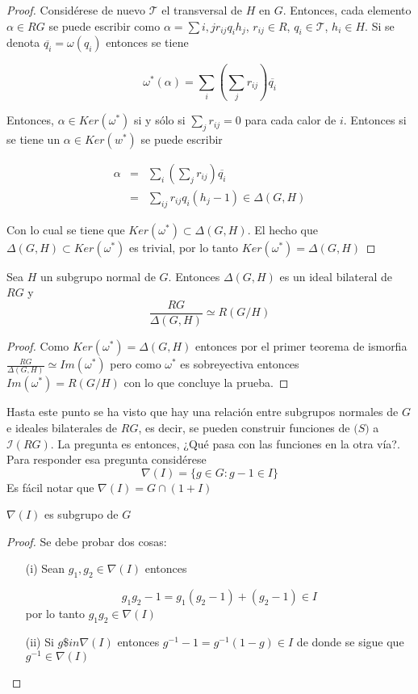 \begin{proof}
Considérese de nuevo $\mathcal{T}$ el transversal de $H$ en $G$. Entonces, cada elemento $\alpha \in RG$ se puede escribir como $ \alpha = \sum{i,j} r_{ij} q_ih_j$, $r_{ij} \in R$, $q_i \in \mathcal{T}$, $h_i \in H$. Si se denota $\overline{q_i} = \omega(q_i)$ entonces se tiene

\[\omega^*(\alpha) = \sum_i\left(\sum_jr_{ij}\right)\overline{q_i} \]

Entonces, $\alpha \in Ker(\omega^*)$ si y sólo si $ \sum_jr_{ij} = 0 $ para cada calor de $i$. Entonces si se tiene un $\alpha \in Ker(w^*)$ se puede escribir

\begin{eqnarray}
\alpha &=& \sum_i\left(\sum_jr_{ij}\right)\overline{q_i} \\
 &=& \sum_{ij}r_{ij}q_i(h_j-1) \in \Delta(G,H)  
\end{eqnarray}

Con lo cual se tiene que $Ker(\omega^*) \subset \Delta(G,H)$. El hecho que $\Delta(G,H) \subset Ker(\omega^*)$ es trivial, por lo tanto $Ker(\omega^*) = \Delta(G,H)$ \qedhere
\end{proof}

\begin{corolario}
Sea $H$ un subgrupo normal de $G$. Entonces $\Delta(G,H)$ es un ideal bilateral de $RG$ y
\[\frac{RG}{\Delta(G,H)} \simeq R(G/H)\]
\end{corolario}

\begin{proof}
Como $Ker(\omega^*) = \Delta(G,H)$ entonces por el primer teorema de ismorfia $ \frac{RG}{\Delta(G,H)} \simeq Im(\omega^*) $ pero como $\omega^*$ es sobreyectiva entonces $Im(\omega^*) = R(G/H)$ con lo que concluye la prueba. \qedhere
\end{proof}


Hasta este punto se ha visto que hay una relación entre subgrupos normales de $G$ e ideales bilaterales de $RG$, es decir, se pueden construir funciones de $\mathcal(S) $ a $\mathcal{I}(RG)$. La pregunta es entonces, ¿Qué pasa con las funciones en la otra vía?. Para responder esa pregunta considérese 
$$ \nabla(I) = \{ g \in G \colon  g-1 \in I\}$$
Es fácil notar que $\nabla(I) = G \cap (1+I)$

\begin{lema}
$\nabla(I)$ es subgrupo de $G$
\end{lema}
\begin{proof}
Se debe probar dos cosas:
\begin{itemize}
\item[(i)] Sean $g_1,g_2 \in \nabla(I)$ entonces 

\[g_1g_2 -1 = g_1(g_2-1) + (g_2-1) \in I \]
por lo tanto $g_1g_2 \in \nabla(I)$

\item[(ii)] Si $g \$in \nabla(I)$ entonces $g^{-1} -1 = g^{-1}(1-g) \in I$ de donde se sigue que $g^{-1} \in \nabla(I)$ \qedhere
\end{itemize}
\end{proof}

